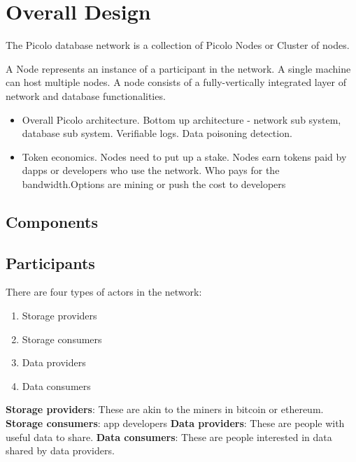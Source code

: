 \section{Overall Design}

The Picolo database network is a collection of Picolo Nodes or Cluster of nodes.

A Node represents an instance of a participant in the network. A single machine
can host multiple nodes. A node consists of a fully-vertically integrated layer of network and database functionalities.

    \begin{itemize}
        \item Overall Picolo architecture.
        	Bottom up architecture - network sub system, database sub system. Verifiable logs. Data poisoning detection.
        \item Token economics.
        	Nodes need to put up a stake. Nodes earn tokens paid by dapps or developers who use the network. Who pays for the bandwidth.Options are mining or push the cost to developers
    \end{itemize}
\subsection{Components}

\subsection{Participants}
There are four types of actors in the network:
\begin{enumerate}
	\item Storage providers
	\item Storage consumers
	\item Data providers
	\item Data consumers \newline
\end{enumerate}
\textbf{Storage providers}: These are akin to the miners in bitcoin or ethereum.
\newline\newline
\textbf{Storage consumers}: \DJ app developers
\newline\newline
\textbf{Data providers}: These are people with useful data to share.
\newline\newline
\textbf{Data consumers}: These are people interested in data shared by data providers.


